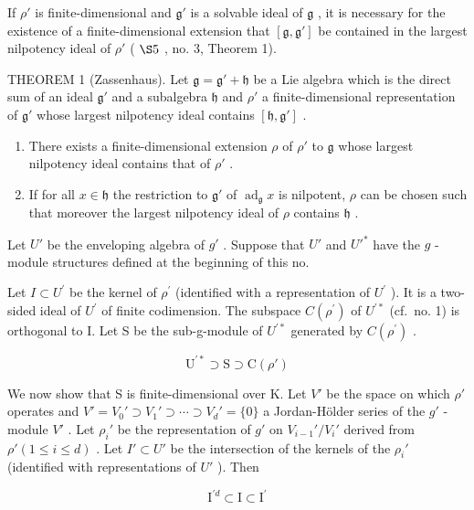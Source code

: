 If \(\rho'\) is finite-dimensional and \(\mathfrak{g}'\) is a solvable ideal of \(\mathfrak{g}\) , it is necessary for the existence of a finite-dimensional extension that \([\mathfrak{g},\mathfrak{g}']\) be contained in the largest nilpotency ideal of \(\rho'\) ( \(\S 5\) , no. 3, Theorem 1).

THEOREM 1 (Zassenhaus). Let \(\mathfrak{g} = \mathfrak{g}' + \mathfrak{h}\) be a Lie algebra which is the direct sum of an ideal \(\mathfrak{g}'\) and a subalgebra \(\mathfrak{h}\) and \(\rho'\) a finite-dimensional representation of \(\mathfrak{g}'\) whose largest nilpotency ideal contains \([\mathfrak{h},\mathfrak{g}']\) .

\begin{enumerate}
\def\labelenumi{(\alph{enumi})}
\item
  There exists a finite-dimensional extension \(\rho\) of \(\rho'\) to \(\mathfrak{g}\) whose largest nilpotency ideal contains that of \(\rho'\) .
\item
  If for all \(x \in \mathfrak{h}\) the restriction to \(\mathfrak{g}'\) of \(\operatorname{ad}_{\mathfrak{g}}x\) is nilpotent, \(\rho\) can be chosen such that moreover the largest nilpotency ideal of \(\rho\) contains \(\mathfrak{h}\) .
\end{enumerate}

Let \(U'\) be the enveloping algebra of \(g'\) . Suppose that \(U'\) and \(U'^*\) have the \(g\) -module structures defined at the beginning of this no.

Let \(I \subset U^{\prime}\) be the kernel of \(\rho^{\prime}\) (identified with a representation of \(U^{\prime}\) ). It is a two-sided ideal of \(U^{\prime}\) of finite codimension. The subspace \(C(\rho^{\prime})\) of \(U^{\prime*}\) (cf.~no. 1) is orthogonal to I. Let S be the sub-g-module of \(U^{\prime*}\) generated by \(C(\rho^{\prime})\) .

\[
\mathrm{U}^{\prime *} \supset \mathrm{S} \supset \mathrm{C}(\rho')
\]

We now show that S is finite-dimensional over K. Let \(V'\) be the space on which \(\rho'\) operates and \(V' = V_{0}' \supset V_{1}' \supset \cdots \supset V_{d}' = \{0\}\) a Jordan-Hölder series of the \(g'\) -module \(V'\) . Let \(\rho_{i}'\) be the representation of \(g'\) on \(V_{i-1}'/V_{i}'\) derived from \(\rho' (1 \leqslant i \leqslant d)\) . Let \(I' \subset U'\) be the intersection of the kernels of the \(\rho_{i}'\) (identified with representations of \(U'\) ). Then

\[
\mathrm{I} ^ {\prime d} \subset \mathrm{I} \subset \mathrm{I} ^ {\prime}
\]

